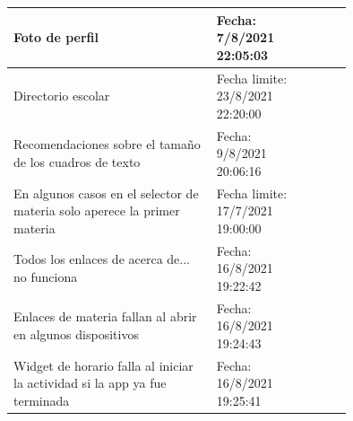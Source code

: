 \documentclass[10pt]{article}
\begin{document}
\begin{table}[H]
\begin{tabular}{|p{0.6\linewidth}|l |p{0.15\linewidth}|}
{Foto de perfil } & Fecha: 7/8/2021 22:05:03  \\ \hline
{Directorio escolar } & Fecha limite: 23/8/2021 22:20:00  \\ \hline
{Recomendaciones sobre el tamaño de los cuadros de texto } &  Fecha: 9/8/2021 20:06:16\\ \hline
{En algunos casos en el selector de materia solo aperece la primer materia } & Fecha limite: 17/7/2021 19:00:00 \\ \hline
{Todos los enlaces de acerca de... no funciona } & Fecha: 16/8/2021 19:22:42 \\ \hline
{Enlaces de materia fallan al abrir en algunos dispositivos } & Fecha: 16/8/2021 19:24:43 \\ \hline
{Widget de horario falla al iniciar la actividad si la app ya fue terminada } & Fecha: 16/8/2021 19:25:41 \\ \hline
\end{tabular}
\end{table}
\end{document}
